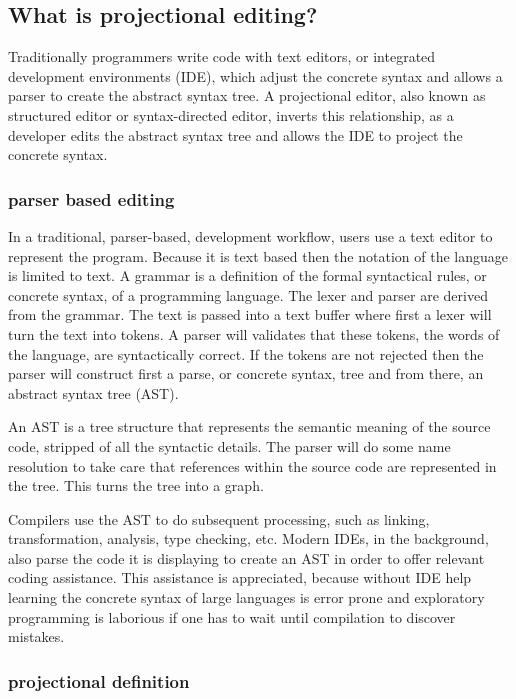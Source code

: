 \subsection{What is projectional editing?}

Traditionally programmers write code with text editors, or integrated development environments (IDE), which adjust the concrete syntax and allows a parser to create the abstract syntax tree.
A projectional editor, also known as structured editor or syntax-directed editor, inverts this relationship, as a developer edits the abstract syntax tree and allows the IDE to project the concrete syntax.

\subsubsection{parser based editing}

In a traditional, parser-based, development workflow, users use a text editor to represent the program.
Because it is text based then the notation of the language is limited to text.
A grammar is a definition of the formal syntactical rules, or concrete syntax, of a programming language.
The lexer and parser are derived from the grammar.
The text is passed into a text buffer where first a lexer will turn the text into tokens. 
A parser will validates that these tokens, the words of the language, are syntactically correct.
If the tokens are not rejected then the parser will construct first a parse, or concrete syntax, tree and from there, an abstract syntax tree (AST).

An AST is a tree structure that represents the semantic meaning of the source code, stripped of all the syntactic details.
The parser will do some name resolution to take care that references within the source code are represented in the tree. 
This turns the tree into a graph.

Compilers use the AST to do subsequent processing, such as linking, transformation, analysis, type checking, etc.
Modern IDEs, in the background, also parse the code it is displaying to create an AST in order to offer relevant coding assistance.
This assistance is appreciated, because without IDE help learning the concrete syntax of large languages is error prone and exploratory programming is laborious if one has to wait until compilation to discover mistakes.


\subsubsection{projectional definition}

